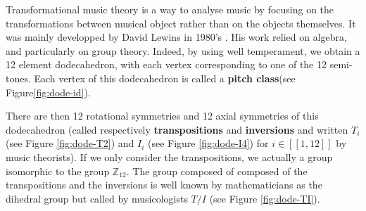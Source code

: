 Transformational music theory is a way to analyse music by focusing on the transformations between musical object rather than on the objects themselves. It was mainly developped by David Lewins in 1980's \cite{rahn_lewin_1987}. His work relied on algebra, and particularly on group theory. Indeed, by using well temperament, we obtain a 12 element dodecahedron, with each vertex corresponding to one of the 12 semi-tones. Each vertex of this dodecahedron is called a \textbf{pitch class}(see Figure\ref{fig:dode-id}).

There are then 12 rotational symmetries and 12 axial symmetries of this dodecahedron (called  respectively \textbf{transpositions} and \textbf{inversions} and written $T_i$\label{nomencl:Ti} (see Figure \ref{fig:dode-T2}) and $I_i$\label{nomencl:Ii} (see Figure \ref{fig:dode-I4}) for $i\in [\![1,12]\!]$ by music theorists). If we only consider the transpositions, we actually a group isomorphic to the group $\mathbb{Z}_{12}$\label{nomencl:Zn}. The group composed of composed of the transpositions and the inversions is well known by mathematicians as the dihedral group but called by musicologists
$T/I$ \label{nomencl:TI} (see Figure \ref{fig:dode-TI}).

